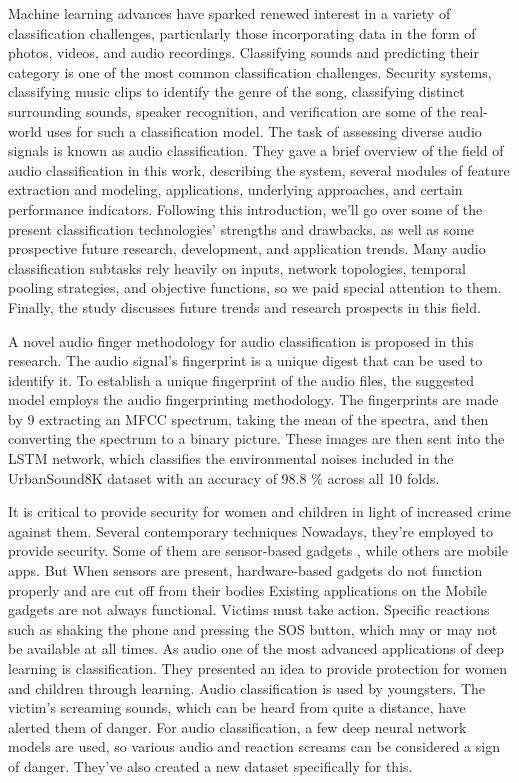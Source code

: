 Machine learning advances have sparked renewed interest \parencite{3} in a variety of classification challenges, particularly those incorporating data in the form of photos, videos, and audio recordings. Classifying sounds and predicting their category is one of the most common classification challenges. Security systems, classifying music clips to identify the genre of the song, classifying distinct surrounding sounds, speaker recognition, and verification are some of the real-world uses for such a classification model. The task of assessing diverse audio signals is known as audio classification. They gave a brief overview of the field of audio classification in this work, describing the system, several modules of feature extraction and modeling, applications, underlying approaches, and certain performance indicators. Following this introduction, we'll go over some of the present classification technologies' strengths and drawbacks, as well as some prospective future research, development, and application trends. Many audio classification subtasks rely heavily on inputs, network topologies, temporal pooling strategies, and objective functions, so we paid special attention to them. Finally, the study discusses future trends and research prospects in this field.

A novel audio finger methodology  for audio classification is proposed in this research. The audio signal's fingerprint is a unique digest that can be used to identify it. To establish a unique fingerprint of the audio files, the suggested model employs the audio fingerprinting methodology. The fingerprints are made by 9 extracting an MFCC spectrum, taking the mean of the spectra, and then converting the spectrum to a binary picture. These images are then sent into the LSTM network, which classifies the environmental noises included in the UrbanSound8K dataset with an accuracy of 98.8 \% across all 10 folds. 

It is critical to provide security for women and children in light of increased crime against them. Several contemporary techniques Nowadays, they're employed to provide security. Some of them are sensor-based gadgets \parencite{5}, while others are mobile apps. But When sensors are present, hardware-based gadgets do not function properly and are cut off from their bodies Existing applications on the Mobile gadgets are not always functional. Victims must take action. Specific reactions such as shaking the phone and pressing the SOS button, which may or may not be available at all times. As audio one of the most advanced applications of deep learning is classification. They presented an idea to provide protection for women and children through learning. Audio classification is used by youngsters. The victim's screaming sounds, which can be heard from quite a distance, have alerted them of danger. For audio classification, a few deep neural network models are used, so various audio and reaction screams can be considered a sign of danger. They've also created a new dataset specifically for this. 

